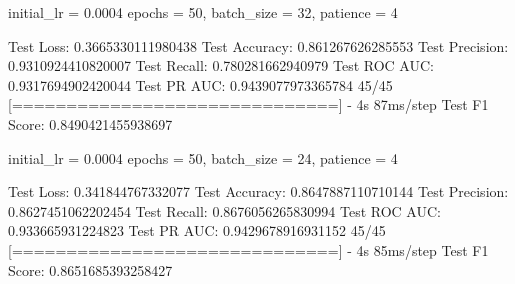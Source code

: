 initial_lr = 0.0004
epochs = 50, batch_size = 32, 
patience = 4

Test Loss: 0.3665330111980438
Test Accuracy: 0.861267626285553
Test Precision: 0.9310924410820007
Test Recall: 0.780281662940979
Test ROC AUC: 0.9317694902420044
Test PR AUC: 0.9439077973365784
45/45 [==============================] - 4s 87ms/step
Test F1 Score: 0.8490421455938697


initial_lr = 0.0004
epochs = 50, batch_size = 24, 
patience = 4

Test Loss: 0.341844767332077
Test Accuracy: 0.8647887110710144
Test Precision: 0.8627451062202454
Test Recall: 0.8676056265830994
Test ROC AUC: 0.933665931224823
Test PR AUC: 0.9429678916931152
45/45 [==============================] - 4s 85ms/step
Test F1 Score: 0.8651685393258427
